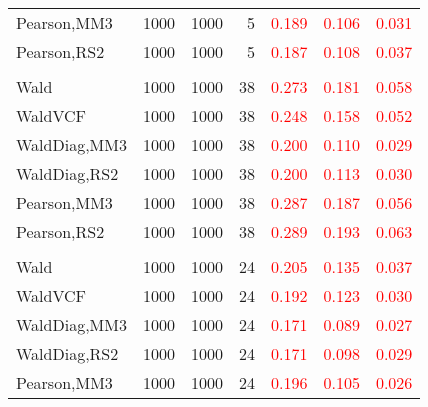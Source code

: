 \documentclass[
]{article}
\begin{document}
\begin{table}[H]
{\begin{tabular}[t]{lrrrrrr}
\hspace{1em}Pearson,MM3 & 1000 & 1000 & 5 & \textcolor{red}{0.189} & \textcolor{red}{0.106} & \textcolor{red}{0.031}\\
\hspace{1em}Pearson,RS2 & 1000 & 1000 & 5 & \textcolor{red}{0.187} & \textcolor{red}{0.108} & \textcolor{red}{0.037}\\
\addlinespace[0.3em]
\multicolumn{7}{l}{\textbf{1F 15V}}\\
\hspace{1em}Wald & 1000 & 1000 & 38 & \textcolor{red}{0.273} & \textcolor{red}{0.181} & \textcolor{red}{0.058}\\
\hspace{1em}WaldVCF & 1000 & 1000 & 38 & \textcolor{red}{0.248} & \textcolor{red}{0.158} & \textcolor{red}{0.052}\\
\hspace{1em}WaldDiag,MM3 & 1000 & 1000 & 38 & \textcolor{red}{0.200} & \textcolor{red}{0.110} & \textcolor{red}{0.029}\\
\hspace{1em}WaldDiag,RS2 & 1000 & 1000 & 38 & \textcolor{red}{0.200} & \textcolor{red}{0.113} & \textcolor{red}{0.030}\\
\hspace{1em}Pearson,MM3 & 1000 & 1000 & 38 & \textcolor{red}{0.287} & \textcolor{red}{0.187} & \textcolor{red}{0.056}\\
\hspace{1em}Pearson,RS2 & 1000 & 1000 & 38 & \textcolor{red}{0.289} & \textcolor{red}{0.193} & \textcolor{red}{0.063}\\
\addlinespace[0.3em]
\multicolumn{7}{l}{\textbf{2F 10V}}\\
\hspace{1em}Wald & 1000 & 1000 & 24 & \textcolor{red}{0.205} & \textcolor{red}{0.135} & \textcolor{red}{0.037}\\
\hspace{1em}WaldVCF & 1000 & 1000 & 24 & \textcolor{red}{0.192} & \textcolor{red}{0.123} & \textcolor{red}{0.030}\\
\hspace{1em}WaldDiag,MM3 & 1000 & 1000 & 24 & \textcolor{red}{0.171} & \textcolor{red}{0.089} & \textcolor{red}{0.027}\\
\hspace{1em}WaldDiag,RS2 & 1000 & 1000 & 24 & \textcolor{red}{0.171} & \textcolor{red}{0.098} & \textcolor{red}{0.029}\\
\hspace{1em}Pearson,MM3 & 1000 & 1000 & 24 & \textcolor{red}{0.196} & \textcolor{red}{0.105} & \textcolor{red}{0.026}\\

\end{tabular}}
\end{table}
\end{document}
